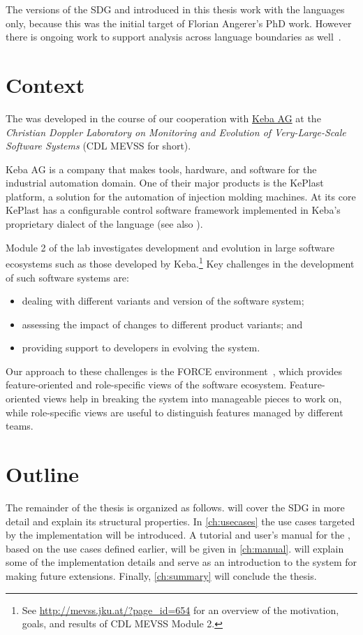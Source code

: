 The versions of the SDG and \SB introduced in this thesis work with the \IEC languages only, because this was the 
initial target of Florian Angerer's PhD work. However there is ongoing work to support analysis across language 
boundaries as well~\cite{DBLP:conf/kbse/Angerer14}.


\section{Context}

The \SB was developed in the course of our cooperation with \href{http://www.keba.com}{Keba AG} at the \emph{Christian 
Doppler Laboratory on Monitoring and Evolution of Very-Large-Scale Software Systems} (CDL MEVSS for short).

Keba AG is a company that makes tools, hardware, and software for the industrial automation domain. One of their major 
products is the KePlast platform, a solution for the automation of injection molding machines. At its core KePlast has 
a configurable control software framework implemented in Keba's proprietary dialect of the \IEC language (see also 
\cite[sec.~3.1]{DBLP:conf/splc/AngererPLGG14}).

Module 2 of the lab investigates development and evolution in large software ecosystems such as those developed by 
Keba.\footnote{See \url{http://mevss.jku.at/?page_id=654} for an overview of the motivation, goals, and results of CDL 
MEVSS Module 2.}
Key challenges in the development of such software systems are:

\begin{itemize}
  \item dealing with different variants and version of the software system;
  \item assessing the impact of changes to different product variants; and
  \item providing support to developers in evolving the system.
\end{itemize}

Our approach to these challenges is the FORCE environment~\cite{HinterreiterDA}, which provides feature-oriented and 
role-specific views of the software ecosystem. Feature-oriented views help in breaking the system into manageable 
pieces to work on, while role-specific views are useful to distinguish features managed by different teams.


\section{Outline}

The remainder of the thesis is organized as follows.
 will cover the SDG in more detail and explain its structural properties.
In \autoref{ch:usecases} the use cases targeted by the \SB implementation will be introduced.
A tutorial and user's manual for the \SB, based on the use cases defined earlier, will be given in \autoref{ch:manual}.
 will explain some of the implementation details and serve as an introduction to the system for making
future extensions.
Finally, \autoref{ch:summary} will conclude the thesis.
